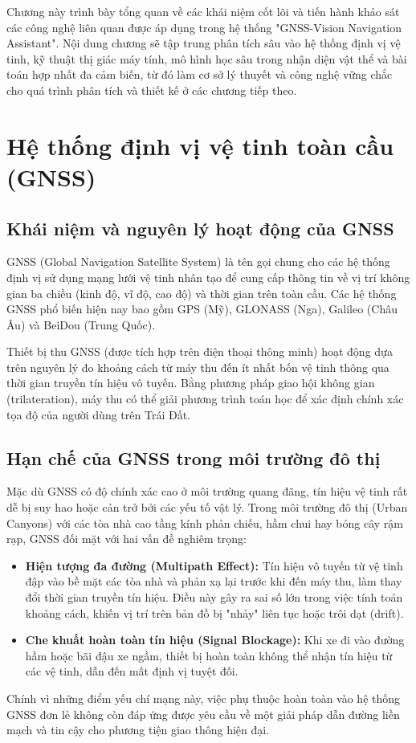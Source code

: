 \documentclass[../DoAn.tex]{subfiles}
\begin{document}
Chương này trình bày tổng quan về các khái niệm cốt lõi và tiến hành khảo sát các công nghệ liên quan được áp dụng trong hệ thống "GNSS-Vision Navigation Assistant". Nội dung chương sẽ tập trung phân tích sâu vào hệ thống định vị vệ tinh, kỹ thuật thị giác máy tính, mô hình học sâu trong nhận diện vật thể và bài toán hợp nhất đa cảm biến, từ đó làm cơ sở lý thuyết và công nghệ vững chắc cho quá trình phân tích và thiết kế ở các chương tiếp theo.

\section{Hệ thống định vị vệ tinh toàn cầu (GNSS)}
\label{section:2.1}

\subsection{Khái niệm và nguyên lý hoạt động của GNSS}
GNSS (Global Navigation Satellite System) là tên gọi chung cho các hệ thống định vị sử dụng mạng lưới vệ tinh nhân tạo để cung cấp thông tin về vị trí không gian ba chiều (kinh độ, vĩ độ, cao độ) và thời gian trên toàn cầu. Các hệ thống GNSS phổ biến hiện nay bao gồm GPS (Mỹ), GLONASS (Nga), Galileo (Châu Âu) và BeiDou (Trung Quốc). 

Thiết bị thu GNSS (được tích hợp trên điện thoại thông minh) hoạt động dựa trên nguyên lý đo khoảng cách từ máy thu đến ít nhất bốn vệ tinh thông qua thời gian truyền tín hiệu vô tuyến. Bằng phương pháp giao hội không gian (trilateration), máy thu có thể giải phương trình toán học để xác định chính xác tọa độ của người dùng trên Trái Đất.

\subsection{Hạn chế của GNSS trong môi trường đô thị}
Mặc dù GNSS có độ chính xác cao ở môi trường quang đãng, tín hiệu vệ tinh rất dễ bị suy hao hoặc cản trở bởi các yếu tố vật lý. Trong môi trường đô thị (Urban Canyons) với các tòa nhà cao tầng kính phản chiếu, hầm chui hay bóng cây rậm rạp, GNSS đối mặt với hai vấn đề nghiêm trọng:
\begin{itemize}
    \item \textbf{Hiện tượng đa đường (Multipath Effect):} Tín hiệu vô tuyến từ vệ tinh đập vào bề mặt các tòa nhà và phản xạ lại trước khi đến máy thu, làm thay đổi thời gian truyền tín hiệu. Điều này gây ra sai số lớn trong việc tính toán khoảng cách, khiến vị trí trên bản đồ bị "nhảy" liên tục hoặc trôi dạt (drift).
    \item \textbf{Che khuất hoàn toàn tín hiệu (Signal Blockage):} Khi xe đi vào đường hầm hoặc bãi đậu xe ngầm, thiết bị hoàn toàn không thể nhận tín hiệu từ các vệ tinh, dẫn đến mất định vị tuyệt đối.
\end{itemize}
Chính vì những điểm yếu chí mạng này, việc phụ thuộc hoàn toàn vào hệ thống GNSS đơn lẻ không còn đáp ứng được yêu cầu về một giải pháp dẫn đường liền mạch và tin cậy cho phương tiện giao thông hiện đại.
\end{document}
